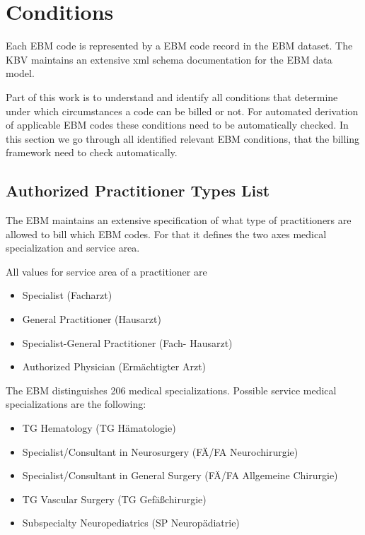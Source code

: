 \section{Conditions}\label{sec:conditions}


Each EBM code is represented by a EBM code record in the EBM dataset.
The KBV maintains an extensive xml schema documentation for the EBM data model.


Part of this work is to understand and identify all conditions that determine under which circumstances a code can be billed or not.
For automated derivation of applicable EBM codes these conditions need to be automatically checked.
In this section we go through all identified relevant EBM conditions, that the billing framework need to check automatically.

\subsection{Authorized Practitioner Types List}

The EBM maintains an extensive specification of what type of practitioners are allowed to bill which EBM codes.
For that it defines the two axes medical specialization and service area.

All values for service area of a practitioner are
\begin{itemize}
    \item Specialist (Facharzt)
    \item General Practitioner (Hausarzt)
    \item Specialist-General Practitioner (Fach- Hausarzt)
    \item Authorized Physician (Ermächtigter Arzt)
\end{itemize}

The EBM distinguishes 206 medical specializations.
Possible service medical specializations are the following:
\begin{itemize}
    \item TG Hematology (TG Hämatologie)
    \item Specialist/Consultant in Neurosurgery (FÄ/FA Neurochirurgie)
    \item Specialist/Consultant in General Surgery (FÄ/FA Allgemeine Chirurgie)
    \item TG Vascular Surgery (TG Gefäßchirurgie)
    \item Subspecialty Neuropediatrics (SP Neuropädiatrie)
\end{itemize}


